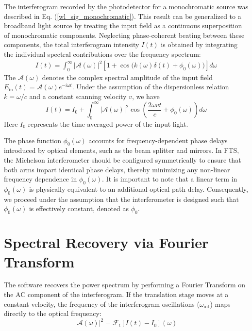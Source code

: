 \documentclass[8pt,a4paper]{article}
\begin{document}
	The interferogram recorded by the photodetector for a monochromatic source was described in Eq. (\ref{wl_sig_monochromatic}). This result can be generalized to a broadband light source by treating the input field as a continuous superposition of monochromatic components. Neglecting phase-coherent beating between these components, the total interferogram intensity $I(t)$ is obtained by integrating the individual spectral contributions over the frequency spectrum:
	\begin{align} \label{wl_interferogram_incoherent}
		I(t) = \int_{0}^{\infty} |\mathcal{A}(\omega)|^2 \left[ 1 + \cos\big(k(\omega)\delta(t) + \phi_0(\omega)\big) \right] d\omega
	\end{align}
	The $\mathcal{A}(\omega)$ denotes the complex spectral amplitude of the input field $E_\mathrm{in}(t) = \mathcal{A}(\omega) e^{-i\omega t}$. Under the assumption of the dispersionless relation $k = \omega/c$ and a constant scanning velocity $v$, we have
	\begin{equation}
		\boxed{I(t) = I_0 + \int_{0}^{\infty} |\mathcal{A}(\omega)|^2 \cos\left(\frac{2\omega vt}{c} + \phi_0(\omega)\right) d\omega}
	\end{equation}
	Here $I_0$ represents the time-averaged power of the input light.
	
	The phase function $\phi_0(\omega)$ accounts for frequency-dependent phase delays introduced by optical elements, such as the beam splitter and mirrors. In FTS, the Michelson interferometer should be configured symmetrically to ensure that both arms impart identical phase delays, thereby minimizing any non-linear frequency dependence in $\phi_0(\omega)$. It is important to note that a linear term in $\phi_0(\omega)$ is physically equivalent to an additional optical path delay. Consequently, we proceed under the assumption that the interferometer is designed such that $\phi_0(\omega)$ is effectively constant, denoted as $\phi_0$.
	
	\section{Spectral Recovery via Fourier Transform}
	
	The software recovers the power spectrum by performing a Fourier Transform on the AC component of the interferogram. If the translation stage moves at a constant velocity, the frequency of the interferogram oscillations ($\omega_{\mathrm{int}}$) maps directly to the optical frequency:
	\begin{equation}
		\left|\mathcal{A}(\omega)\right|^2 = \mathcal{F}_t\left[I(t) - I_0\right](\omega)
	\end{equation}
	
\end{document}
